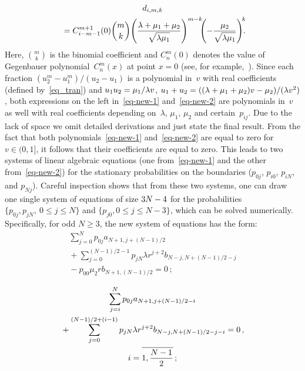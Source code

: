\begin{multicols}{2}

\noindent
\begin{multline*}
d_{i,m,k}\\
{}=C_{i-m-1}^{m+1} (0)\binom{m}{k}\!
\left (
\fr{\lambda +\mu_1 + \mu_2}{\sqrt{\lambda\mu_1}}
\right )^{m-k}\!\!\!
\left(-\fr{\mu_2 }{\sqrt{\lambda\mu_1}}\right)^{\!k}\!\!\!.\hspace*{-2.316pt}
\end{multline*}
Here, $\binom{m}{k}$ is the binomial coefficient
and $C^m_n(0)$ denotes the value of 
Gegenbauer polynomial~$C^m_n(x)$ at point $x=0$ 
(see, for example,~\cite[p.\,175]{erdelyi}).
Since each fraction $(u_2^m - u_1^m) / (u_2-u_1)$
is a polynomial in~$v$ with real coefficients
(defined by~\eqref{eq_tran})
and $u_1u_2={\mu_1}/{\lambda v}$,  
$u_1+u_2=((\lambda+\mu_1+\mu_2)v-\mu_2)/(\lambda v^2)$,
both expressions on the left in~\eqref{eq-new-1} and~\eqref{eq-new-2} 
are polynomials in~$v$ as well
with real coefficients depending on~$\lambda$, $\mu_1$, $\mu_2$
and certain~$p_{ij}$. Due to the lack of space we omit  
detailed derivations and just state the final result.
From the fact that both polynomials~\eqref{eq-new-1} and~\eqref{eq-new-2} 
are equal to zero for $v \in (0,1]$, it follows 
that their coefficients are equal to zero.
This leads to two systems of linear algebraic equations (one from~\eqref{eq-new-1}
and the other from~\eqref{eq-new-2}) for the stationary
probabilities on the boundaries ($p_{0j}$, $p_{i0}$, $p_{iN}$,
and $p_{Nj}$). Careful inspection shows that from these two systems,
one can draw one single system of equations of size $3N\hm-4$ for the probabilities 
$\{p_{0j},p_{jN},\ 0 \le j \le N\}$ and $\{p_{j0}, 0 \le j \le N-3 \}$,
which can be solved numerically. 
Specifically, for odd $N\ge3$,
the new system of equations has the form:
\begin{multline}
\label{n1}
\sum\limits_{j=0}^N p_{0j} a_{N+1,j+(N-1)/2} 
\\
{}+
\sum_{j=0}^{(N-1)/2-1}
p_{jN} \lambda r^{j+2} b_{N-j,N+(N-1)/2-j}
\\
{}- p_{00} \mu_2 r b_{N+1,(N-1)/2}=0\,;
\end{multline}

\vspace*{-12pt}

\noindent
\begin{multline}
\label{n2}
\sum\limits_{j=i}^N
p_{0j} a_{N+1,j+(N-1)/2-i} 
\\
{}+
\sum\limits_{j=0}^{(N-1)/2+(i-1)}
p_{jN} \lambda r^{j+2} b_{N-j,N+(N-1)/2-j-i}=0\,,\\ 
i=\overline{1,\displaystyle\frac{\displaystyle N-1\mathstrut}{\displaystyle 2\mathstrut}}\,;
\end{multline}


\end{multicols}
